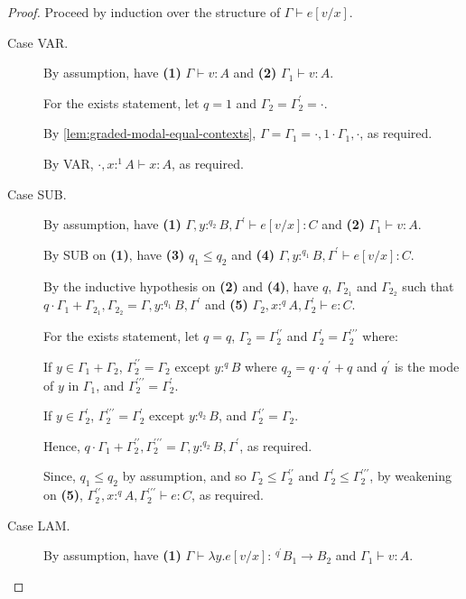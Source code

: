 \documentclass[acmsmall,screen,nonacm]{acmart}
\newcommand{\tee}{\vdash}
\begin{document}
\begin{proof}
  Proceed by induction over the structure of $\Gamma \tee e[v/x]$.
  \begin{description}
    \item[Case VAR.] 
    By assumption, have \textbf{(1)} $\Gamma \tee v : A$ and \textbf{(2)} $\Gamma_1 \tee v : A$.
    
    For the exists statement, let $q = 1$ and $\Gamma_2 = \Gamma_2^\prime = \cdot$.

    By \ref{lem:graded-modal-equal-contexts}, $\Gamma = \Gamma_1 = \cdot, 1 \cdot \Gamma_1, \cdot$, as required.
    
    By VAR, $\cdot, x :^1 A \tee x : A$, as required.
    \\
    \item[Case SUB.]
    By assumption, have \textbf{(1)} $\Gamma, y :^{q_2} B, \Gamma^\prime \tee e[v/x] : C$ and \textbf{(2)} $\Gamma_1 \tee v : A$.

    By SUB on \textbf{(1)}, have \textbf{(3)} $q_1 \le q_2$ and \textbf{(4)} $\Gamma, y :^{q_1} B, \Gamma^\prime \tee e[v/x] : C$.

    By the inductive hypothesis on \textbf{(2)} and \textbf{(4)}, have $q$, $\Gamma_{2_1}$ and $\Gamma_{2_2}$ such that $q \cdot \Gamma_1 + \Gamma_{2_1}, \Gamma_{2_2} = \Gamma, y :^{q_1} B, \Gamma^\prime$ and \textbf{(5)} $\Gamma_2, x :^q A, \Gamma_2^\prime \tee e : C$.

    For the exists statement, let $q = q$, $\Gamma_2 = \Gamma_2^{\prime\prime}$ and $\Gamma_2^\prime = \Gamma_2^{\prime\prime\prime}$ where: 
    
    If $y \in \Gamma_1 + \Gamma_2$, $\Gamma_2^{\prime\prime} = \Gamma_2$ except $y :^q B$ where $q_2 = q \cdot q^\prime + q$ and $q^\prime$ is the mode of $y$ in $\Gamma_1$, and $\Gamma_2^{\prime\prime\prime} = \Gamma_2^\prime$.
    
    If $y \in \Gamma_2^\prime$, $\Gamma_2^{\prime\prime\prime} = \Gamma_2^\prime$ except $y :^{q_2} B$, and $\Gamma_2^{\prime\prime} = \Gamma_2$.

    Hence, $q \cdot \Gamma_1 + \Gamma_2^{\prime\prime}, \Gamma_2^{\prime\prime\prime} = \Gamma, y :^{q_2} B, \Gamma^\prime$, as required.

    Since, $q_1 \le q_2$ by assumption, and so $\Gamma_2 \le \Gamma_2^{\prime\prime}$ and $\Gamma_2^\prime \le \Gamma_2^{\prime\prime\prime}$, by weakening on \textbf{(5)}, $\Gamma_2^{\prime\prime}, x :^q A, \Gamma_2^{\prime\prime\prime} \tee e : C$, as required.
    \\
    \item[Case LAM.] 
    By assumption, have \textbf{(1)} $\Gamma \tee \lambda y.e[v/x] : \,^{q^\prime} B_1 \rightarrow B_2$ and $\Gamma_1 \tee v : A$.


\end{description}
\end{proof}
\end{document}
